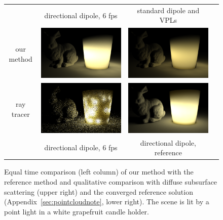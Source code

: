 \begin{figure}[t]
\centering
\begin{tabular}{@{}c@{$\,$}c@{}c@{}c@{}}
& directional dipole, 6 fps & standard dipole and VPLs \\
\begin{sideways}\hspace*{1.5em}our method\end{sideways}\hspace{0.5mm} &
\includegraphics[width=0.43\columnwidth]{figures/candle_holder_directional_6fps.png} &
\includegraphics[width=0.43\columnwidth]{figures/candle_holder_jensen_converged.png} \\[-4pt]
\begin{sideways}\hspace*{1.7em}ray tracer\end{sideways}\hspace{0.5mm} &
\includegraphics[width=0.43\columnwidth]{figures/scene_comparison_optix_6fps.png} &
\includegraphics[width=0.43\columnwidth]{figures/scene_comparison_converged.png} \\[-0.5ex]
& directional dipole, 6 fps & directional dipole, reference \\[-1ex]
\end{tabular}
\caption{Equal time comparison (left column) of our method with the reference method and qualitative comparison with diffuse subsurface scattering (upper right) and the converged reference solution (Appendix~\ref{sec:pointcloudnote}, lower right). The scene is lit by a point light in a white grapefruit candle holder.} %
\label{fig:optixcomparison}
\end{figure}
